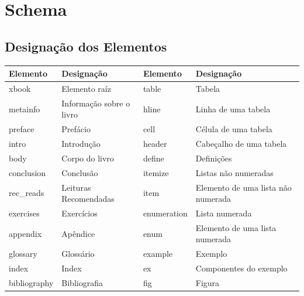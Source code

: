 \documentclass[a4paper]{article}
\begin{document}
\newpage

\section{\LARGE Schema}

\subsection{\large Designação dos Elementos}
                               
\bigskip
\begin{center}
\begin{tabular}[c]{|l|l|l|l|}
\hline
\large\textbf{Elemento} & \large\textbf{Designação} & \large\textbf{Elemento} & \large\textbf{Designação}\\
\hline
\normalsize xbook & \normalsize Elemento raíz & \normalsize table & \normalsize Tabela\\
\hline
\normalsize metainfo & \normalsize Informação sobre o livro & \normalsize hline & \normalsize Linha de uma tabela\\
\hline
\normalsize preface & \normalsize Prefácio & \normalsize cell & \normalsize Célula de uma tabela\\
\hline
\normalsize intro & \normalsize Introdução & \normalsize header & \normalsize Cabeçalho de uma tabela\\
\hline
\normalsize body & \normalsize Corpo do livro & \normalsize define & \normalsize Definições\\
\hline
\normalsize conclusion & \normalsize Conclusão & \normalsize itemize & \normalsize Listas não numeradas\\
\hline
\normalsize rec_reads & \normalsize Leituras Recomendadas & \normalsize item & \normalsize Elemento de uma lista não numerada\\
\hline
\normalsize exercises & \normalsize Exercícios & \normalsize enumeration & \normalsize Lista numerada\\
\hline
\normalsize appendix & \normalsize Apêndice & \normalsize enum & \normalsize Elemento de uma lista numerada\\
\hline
\normalsize glossary & \normalsize Glossário & \normalsize example & \normalsize Exemplo\\
\hline
\normalsize index & \normalsize Index & \normalsize ex & \normalsize Componentes do exemplo\\
\hline
\normalsize bibliography & \normalsize Bibliografia & \normalsize fig & \normalsize Figura\\

\end{tabular}
\end{center}
\end{document}
